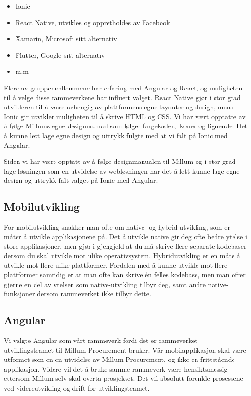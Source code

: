 \begin{itemize}
  \item Ionic
  \item React Native, utvikles og oppretholdes av Facebook
  \item Xamarin, Microsoft sitt alternativ
  \item Flutter, Google sitt alternativ
  \item m.m
\end{itemize}

Flere av gruppemedlemmene har erfaring med Angular og React, og muligheten til å velge disse rammeverkene har influert valget. React Native gjør i stor grad utvikleren til å være avhengig av plattformens egne layouter og design, mens Ionic gir utvikler muligheten til å skrive HTML og CSS. Vi har vært opptatte av å følge Millums egne designmanual som følger fargekoder, ikoner og lignende. Det å kunne lett lage egne design og uttrykk fulgte med at vi falt på Ionic med Angular. 

Siden vi har vært opptatt av å følge designmanualen til Millum og i stor grad lage løsningen som en utvidelse av webløsningen har det å lett kunne lage egne design og uttrykk falt valget på Ionic med Angular. 
 
 \subsection{\textbf{Mobilutvikling}}
 For mobilutvikling snakker man ofte om native- og hybrid-utvikling, som er måter å utvikle applikasjonene på. Det å utvikle native gir deg ofte bedre ytelse i store applikasjoner, men gjør i gjengjeld at du må skrive flere separate kodebaser dersom du skal utvikle mot ulike operativsystem. Hybridutvikling er en måte å utvikle mot flere ulike plattformer. Fordelen med å kunne utvikle mot flere plattformer samtidig er at man ofte kan skrive én felles kodebase, men man ofrer gjerne en del av ytelsen som native-utvikling tilbyr deg, samt andre native-funksjoner dersom rammeverket ikke tilbyr dette. 
 
 

\subsection{\textbf{Angular}}
Vi valgte Angular som vårt rammeverk fordi det er rammeverket utviklingsteamet til Millum Procurement bruker.  Vår mobilapplikasjon skal være utformet som en en utvidelse av Millum Procurement, og ikke en frittstående applikasjon. Videre vil det å bruke samme rammeverk være hensiktsmessig ettersom Millum selv skal overta prosjektet. Det vil absolutt forenkle prosessene ved videreutvikling og drift for utviklingsteamet.

